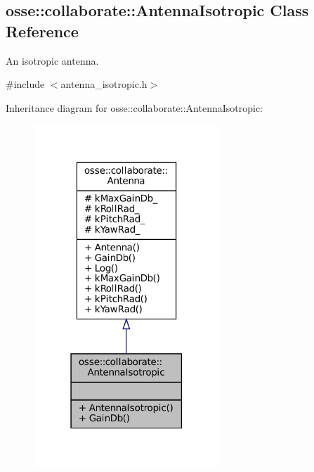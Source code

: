 \hypertarget{classosse_1_1collaborate_1_1_antenna_isotropic}{}\subsection{osse\+:\+:collaborate\+:\+:Antenna\+Isotropic Class Reference}
\label{classosse_1_1collaborate_1_1_antenna_isotropic}


An isotropic antenna.  




{\ttfamily \#include $<$antenna\+\_\+isotropic.\+h$>$}



Inheritance diagram for osse\+:\+:collaborate\+:\+:Antenna\+Isotropic\+:
\nopagebreak
\begin{figure}[H]
\begin{center}
\leavevmode
\includegraphics[width=198pt]{classosse_1_1collaborate_1_1_antenna_isotropic__inherit__graph}
\end{center}
\end{figure}
